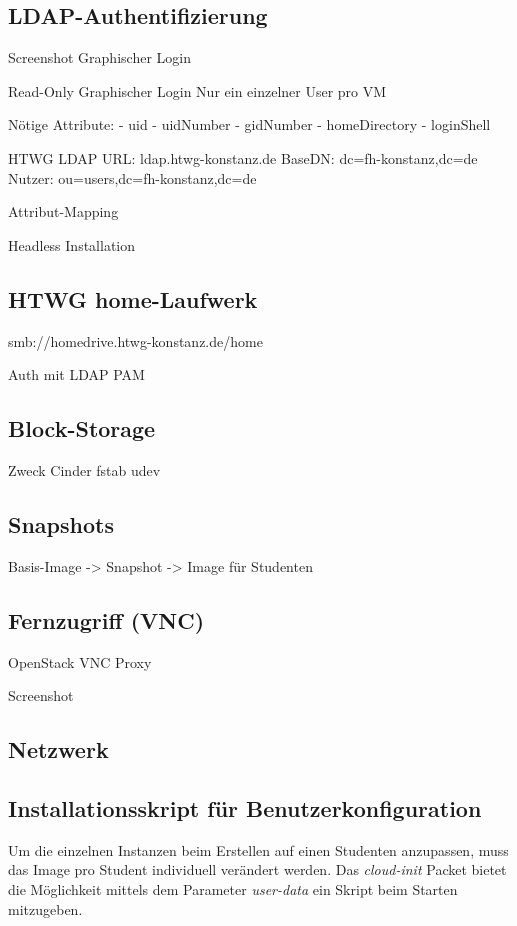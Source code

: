 \subsection{LDAP-Authentifizierung}

Screenshot Graphischer Login

Read-Only
Graphischer Login
Nur ein einzelner User pro VM

Nötige Attribute:
- uid
- uidNumber
- gidNumber
- homeDirectory
- loginShell

HTWG LDAP
URL: ldap.htwg-konstanz.de
BaseDN: dc=fh-konstanz,dc=de
Nutzer: ou=users,dc=fh-konstanz,dc=de

Attribut-Mapping

Headless Installation

\subsection{HTWG home-Laufwerk}

smb://homedrive.htwg-konstanz.de/home

Auth mit LDAP
PAM

\subsection{Block-Storage}

Zweck
Cinder
fstab
udev

\subsection{Snapshots}

Basis-Image -> Snapshot -> Image für Studenten


\subsection{Fernzugriff (VNC)}

OpenStack VNC Proxy

Screenshot

\subsection{Netzwerk}

\subsection{Installationsskript  für Benutzerkonfiguration}

Um die einzelnen Instanzen beim Erstellen auf einen Studenten anzupassen, muss das Image pro Student individuell verändert werden. 
Das \emph{cloud-init} Packet bietet die Möglichkeit mittels dem Parameter \emph{user-data} ein Skript beim Starten mitzugeben. 

